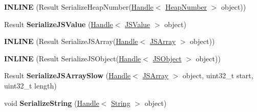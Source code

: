 \begin{DoxyCompactItemize}
\item 
{\bfseries I\+N\+L\+I\+NE} (Result Serialize\+Heap\+Number(\hyperlink{classv8_1_1internal_1_1_handle}{Handle}$<$ \hyperlink{classv8_1_1internal_1_1_heap_number}{Heap\+Number} $>$ object))\hypertarget{classv8_1_1internal_1_1_b_a_s_e___e_m_b_e_d_d_e_d_a7e5bbdf1f13a55094efd9f742240550c}{}\label{classv8_1_1internal_1_1_b_a_s_e___e_m_b_e_d_d_e_d_a7e5bbdf1f13a55094efd9f742240550c}

\item 
Result {\bfseries Serialize\+J\+S\+Value} (\hyperlink{classv8_1_1internal_1_1_handle}{Handle}$<$ \hyperlink{classv8_1_1internal_1_1_j_s_value}{J\+S\+Value} $>$ object)\hypertarget{classv8_1_1internal_1_1_b_a_s_e___e_m_b_e_d_d_e_d_ab787fdc9f89434ccbeaa46b63f061d49}{}\label{classv8_1_1internal_1_1_b_a_s_e___e_m_b_e_d_d_e_d_ab787fdc9f89434ccbeaa46b63f061d49}

\item 
{\bfseries I\+N\+L\+I\+NE} (Result Serialize\+J\+S\+Array(\hyperlink{classv8_1_1internal_1_1_handle}{Handle}$<$ \hyperlink{classv8_1_1internal_1_1_j_s_array}{J\+S\+Array} $>$ object))\hypertarget{classv8_1_1internal_1_1_b_a_s_e___e_m_b_e_d_d_e_d_a34897916c0e3f96edd301804a0a38461}{}\label{classv8_1_1internal_1_1_b_a_s_e___e_m_b_e_d_d_e_d_a34897916c0e3f96edd301804a0a38461}

\item 
{\bfseries I\+N\+L\+I\+NE} (Result Serialize\+J\+S\+Object(\hyperlink{classv8_1_1internal_1_1_handle}{Handle}$<$ \hyperlink{classv8_1_1internal_1_1_j_s_object}{J\+S\+Object} $>$ object))\hypertarget{classv8_1_1internal_1_1_b_a_s_e___e_m_b_e_d_d_e_d_ac53e4d08b8d64df49fd3b01e35676168}{}\label{classv8_1_1internal_1_1_b_a_s_e___e_m_b_e_d_d_e_d_ac53e4d08b8d64df49fd3b01e35676168}

\item 
Result {\bfseries Serialize\+J\+S\+Array\+Slow} (\hyperlink{classv8_1_1internal_1_1_handle}{Handle}$<$ \hyperlink{classv8_1_1internal_1_1_j_s_array}{J\+S\+Array} $>$ object, uint32\+\_\+t start, uint32\+\_\+t length)\hypertarget{classv8_1_1internal_1_1_b_a_s_e___e_m_b_e_d_d_e_d_a01911d94beb1f812c685b6f79a3b2720}{}\label{classv8_1_1internal_1_1_b_a_s_e___e_m_b_e_d_d_e_d_a01911d94beb1f812c685b6f79a3b2720}

\item 
void {\bfseries Serialize\+String} (\hyperlink{classv8_1_1internal_1_1_handle}{Handle}$<$ \hyperlink{classv8_1_1internal_1_1_string}{String} $>$ object)\hypertarget{classv8_1_1internal_1_1_b_a_s_e___e_m_b_e_d_d_e_d_ad48c5f57a854bfaded51137bb2231929}{}\label{classv8_1_1internal_1_1_b_a_s_e___e_m_b_e_d_d_e_d_ad48c5f57a854bfaded51137bb2231929}


\end{DoxyCompactItemize}
